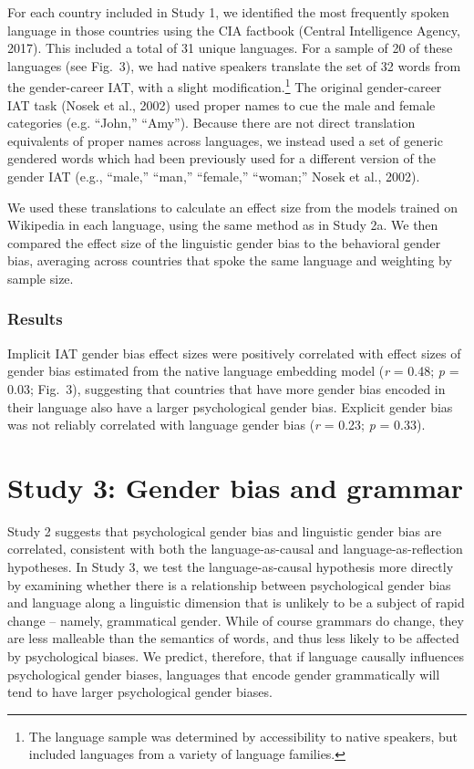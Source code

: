 \documentclass[10pt, letterpaper]{article}
\begin{document}
For each country included in Study 1, we identified the most frequently
spoken language in those countries using the CIA factbook (Central
Intelligence Agency, 2017). This included a total of 31 unique
languages. For a sample of 20 of these languages (see Fig.~3), we had
native speakers translate the set of 32 words from the gender-career
IAT, with a slight
modification.\footnote{The language sample was determined by accessibility to native speakers, but included languages from a variety of language families.}
The original gender-career IAT task (Nosek et al., 2002) used proper
names to cue the male and female categories (e.g. ``John,'' ``Amy'').
Because there are not direct translation equivalents of proper names
across languages, we instead used a set of generic gendered words which
had been previously used for a different version of the gender IAT
(e.g., ``male,'' ``man,'' ``female,'' ``woman;'' Nosek et al., 2002).

We used these translations to calculate an effect size from the models
trained on Wikipedia in each language, using the same method as in Study
2a. We then compared the effect size of the linguistic gender bias to
the behavioral gender bias, averaging across countries that spoke the
same language and weighting by sample size.

\subsubsection{Results}\label{results-2}

Implicit IAT gender bias effect sizes were positively correlated with
effect sizes of gender bias estimated from the native language embedding
model (\emph{r} = 0.48; \emph{p} = 0.03; Fig.~3), suggesting that
countries that have more gender bias encoded in their language also have
a larger psychological gender bias. Explicit gender bias was not
reliably correlated with language gender bias (\emph{r} = 0.23; \emph{p}
= 0.33).

\section{Study 3: Gender bias and
grammar}\label{study-3-gender-bias-and-grammar}

Study 2 suggests that psychological gender bias and linguistic gender
bias are correlated, consistent with both the language-as-causal and
language-as-reflection hypotheses. In Study 3, we test the
language-as-causal hypothesis more directly by examining whether there
is a relationship between psychological gender bias and language along a
linguistic dimension that is unlikely to be a subject of rapid change --
namely, grammatical gender. While of course grammars do change, they are
less malleable than the semantics of words, and thus less likely to be
affected by psychological biases. We predict, therefore, that if
language causally influences psychological gender biases, languages that
encode gender grammatically will tend to have larger psychological
gender biases.
\end{document}
